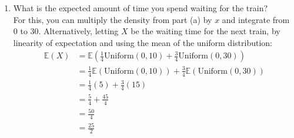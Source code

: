 \documentclass[12pt]{article}
\def\E{{\mathbb E}}
\begin{document}
\begin{enumerate}
\begin{enumerate}
\item What is the expected amount of time you spend waiting for the train?\\

For this, you can multiply the density from part (a) by $x$ and integrate from 0 to 30. Alternatively, letting $X$ be the waiting time for the next train, by linearity of expectation and using the mean of the uniform distribution:
\begin{align*}
\E(X) &= \E \left( \frac{1}{4} \text{Uniform}(0, 10) + \frac{3}{4} \text{Uniform}(0, 30) \right) \\
&= \frac{1}{4} \E(\text{Uniform}(0, 10) ) + \frac{3}{4} \E(  \text{Uniform}(0, 30) ) \\
&= \frac{1}{4} (5) + \frac{3}{4} (15) \\
&= \frac{5}{4} + \frac{45}{4} \\
&= \frac{50}{4} \\
&= \frac{25}{2}
\end{align*}



\end{enumerate}
\end{enumerate}
\end{document}
